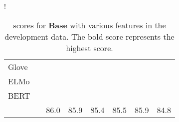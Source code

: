 \documentclass[letterpaper]{article} \usepackage{aaai20}  \usepackage{times}  \usepackage{helvet} \usepackage{courier}  \usepackage[hyphens]{url}  \usepackage{graphicx} \urlstyle{rm} \def\UrlFont{\rm}  \usepackage{graphicx}  \frenchspacing  \setlength{\pdfpagewidth}{8.5in}  \setlength{\pdfpageheight}{11in}  \usepackage{tabu}
\begin{document}
\begin{table}[t]
    \centering
\resizebox {0.8\columnwidth} {!} {
\small
    \begin{tabular}{|l|c|c|c|c|c|c|c|}
         \hline
         Glove              &  &  &              &  &  &              &              \\
         ELMo               &  &  &  &              &              &  &              \\
         BERT               &  &              &  &  &              &              &  \\
         \hline
            &  & 86.0 & 85.9 & 85.4 & 85.5 & 85.9 & 84.8 \\
         \hline
    \end{tabular}
}
    \caption{ scores for \textbf{Base} with various features in the development data. The bold score represents the highest score. \label{tb:eval:dev}}
\end{table}
\end{document}
